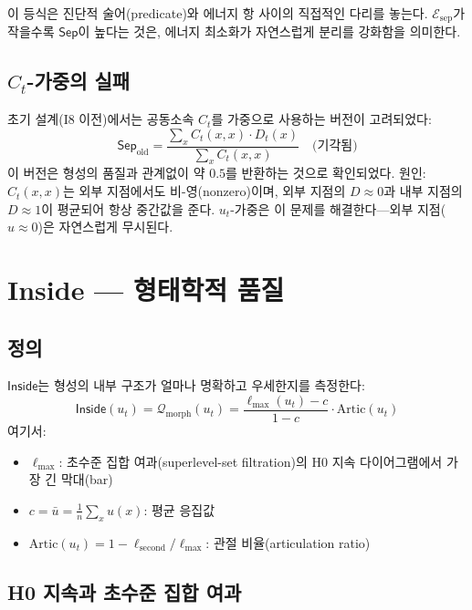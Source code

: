 이 등식은 진단적 술어(predicate)와 에너지 항 사이의 직접적인 다리를 놓는다. $\mathcal{E}_{\mathrm{sep}}$가 작을수록 $\mathsf{Sep}$이 높다는 것은, 에너지 최소화가 자연스럽게 분리를 강화함을 의미한다.

\subsection{$C_t$-가중의 실패}

초기 설계(I8 이전)에서는 공동소속 $C_t$를 가중으로 사용하는 버전이 고려되었다:
\begin{equation}
    \mathsf{Sep}_{\mathrm{old}} = \frac{\sum_x C_t(x,x) \cdot D_t(x)}{\sum_x C_t(x,x)} \quad \text{(기각됨)}
    \label{eq:sep-old}
\end{equation}
이 버전은 형성의 품질과 관계없이 약 $0.5$를 반환하는 것으로 확인되었다. 원인: $C_t(x,x)$는 외부 지점에서도 비-영(nonzero)이며, 외부 지점의 $D \approx 0$과 내부 지점의 $D \approx 1$이 평균되어 항상 중간값을 준다. $u_t$-가중은 이 문제를 해결한다---외부 지점($u \approx 0$)은 자연스럽게 무시된다.


\section{Inside --- 형태학적 품질}
\label{sec:inside}

\subsection{정의}

$\mathsf{Inside}$는 형성의 내부 구조가 얼마나 명확하고 우세한지를 측정한다:
\begin{equation}
    \mathsf{Inside}(u_t) = \mathcal{Q}_{\mathrm{morph}}(u_t) = \frac{\ell_{\max}(u_t) - c}{1 - c} \cdot \mathrm{Artic}(u_t)
    \label{eq:inside}
\end{equation}
여기서:
\begin{itemize}
    \item $\ell_{\max}$: 초수준 집합 여과(superlevel-set filtration)의 H0 지속 다이어그램에서 가장 긴 막대(bar)
    \item $c = \bar{u} = \frac{1}{n}\sum_x u(x)$: 평균 응집값
    \item $\mathrm{Artic}(u_t) = 1 - \ell_{\mathrm{second}} / \ell_{\max}$: 관절 비율(articulation ratio)
\end{itemize}

\subsection{H0 지속과 초수준 집합 여과}

